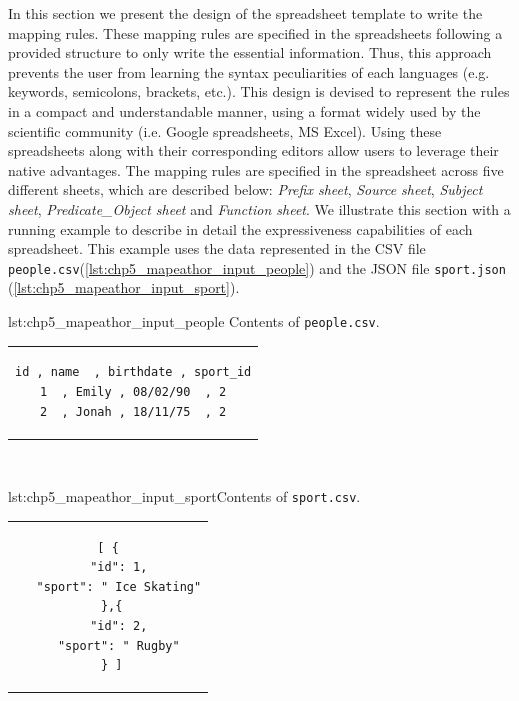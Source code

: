 
In this section we present the design of the spreadsheet template to write the mapping rules. 
These mapping rules are specified in the spreadsheets following a provided structure to only write the essential information. Thus, this approach prevents the user from learning the syntax peculiarities of each languages (e.g. keywords, semicolons, brackets, etc.).
This design is devised to represent the rules in a compact and understandable manner, using a format widely used by the scientific community (i.e. Google spreadsheets, MS Excel). 
Using these spreadsheets along with their corresponding editors allow users to leverage their native advantages.
The mapping rules are specified in the spreadsheet across five different sheets, which are described below: \textit{Prefix sheet}, \textit{Source sheet}, \textit{Subject sheet}, \textit{Predicate\_Object sheet} and \textit{Function sheet}. We illustrate this section with a running example to describe in detail the expressiveness capabilities of each spreadsheet. This example uses the data represented in the CSV file \texttt{people.csv}(\cref{lst:chp5_mapeathor_input_people}) and the JSON file \texttt{sport.json} (\cref{lst:chp5_mapeathor_input_sport}). 

\begin{minipage}{0.48\linewidth}
\begin{captionedlisting}{lst:chp5_mapeathor_input_people}{ Contents of \texttt{people.csv}.}
\centering
\begin{tabular}{c}
{
\begin{lstlisting}[basicstyle=\ttfamily\small,label={list:example1},columns=flexible]
id , name  , birthdate , sport_id
1  , Emily , 08/02/90  , 2
2  , Jonah , 18/11/75  , 2
\end{lstlisting}
}
\end{tabular}
\end{captionedlisting}
\end{minipage}
\,\,\,\,\hfill
\begin{minipage}{0.52\linewidth}
\begin{captionedlisting}{lst:chp5_mapeathor_input_sport}{Contents of \texttt{sport.csv}.}
\centering
\begin{tabular}{c}
\hspace{1.5em}
{
\begin{lstlisting}[basicstyle=\ttfamily\small,label={list:example1},columns=flexible]
[ {
   "id": 1,
   "sport": " Ice Skating"
 },{
   "id": 2,
   "sport": " Rugby"
 } ]
\end{lstlisting}
}
\end{tabular}
\end{captionedlisting}
\end{minipage}



